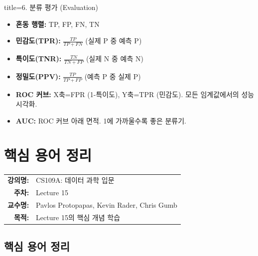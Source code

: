 \documentclass[11pt,a4paper]{book}
\makeatletter
\theoremstyle{definition}
\newcommand{\metainfo}[4]{
\begin{tcolorbox}[
    colback=lightpurple,
    colframe=darkpurple,
    boxrule=1pt,
    arc=2mm,
    left=10pt,
    right=10pt,
    top=8pt,
    bottom=8pt
]
\begin{tabular}{@{}rl@{}}
\textbf{강의명:} & #1 \\[0.3em]
\textbf{주차:} & #2 \\[0.3em]
\textbf{교수명:} & #3 \\[0.3em]
\textbf{목적:} & \begin{minipage}[t]{0.75\textwidth}#4\end{minipage}
\end{tabular}
\end{tcolorbox}
}
\makeatother
\begin{document}
\begin{tcolorbox}{title=6. 분류 평가 (Evaluation)}
\begin{itemize}
    \item \textbf{혼동 행렬:} TP, FP, FN, TN
    \item \textbf{민감도(TPR):} $\frac{TP}{TP+FN}$ (실제 P 중 예측 P)
    \item \textbf{특이도(TNR):} $\frac{TN}{TN+FP}$ (실제 N 중 예측 N)
    \item \textbf{정밀도(PPV):} $\frac{TP}{TP+FP}$ (예측 P 중 실제 P)
    \item \textbf{ROC 커브:} X축=FPR (1-특이도), Y축=TPR (민감도). 모든 임계값에서의 성능 시각화.
    \item \textbf{AUC:} ROC 커브 아래 면적. 1에 가까울수록 좋은 분류기.
\end{itemize}
\end{tcolorbox}


\chapter{핵심 용어 정리}
\label{ch:lecture15}

\metainfo{CS109A: 데이터 과학 입문}{Lecture 15}{Pavlos Protopapas, Kevin Rader, Chris Gumb}{Lecture 15의 핵심 개념 학습}


\begin{abstract}
\textbf{개요 (Overview)}

본 문서는 로지스틱 회귀를 3개 이상의 클래스를 분류하는 \textbf{다중 클래스(Multiclass)} 문제로 확장하는 방법을 다룹니다.
기준이 되는 하나의 클래스와 나머지를 비교하는 \textbf{다항(Multinomial) 로지스틱 회귀}와, 각 클래스와 그 외 모든 클래스를 비교하는 \textbf{OvR(One-vs-Rest)} 접근법을 배웁니다.
분류 모델의 성능을 평가하기 위한 \textbf{혼동 행렬(Confusion Matrix)}, \textbf{ROC 곡선}, \textbf{AUC} 개념을 학습합니다.
마지막으로, 파라미터를 확률 분포로 간주하는 \textbf{베이즈(Bayesian) 추론}의 기본 개념과, 이항 분포의 켤레 사전 확률인 \textbf{베타 분포(Beta Distribution)}를 활용한 \textbf{베타-이항 모델}을 살펴보고, \textbf{계층 모델(Hierarchical Model)}의 필요성을 소개합니다.
\end{abstract}


\section{핵심 용어 정리}
\end{document}
